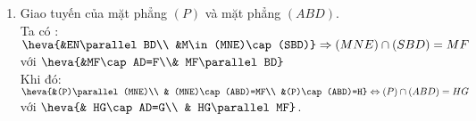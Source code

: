 \begin{bt}
{\begin{enumerate}
			\item Giao tuyến của mặt phẳng $(P)$ và mặt phẳng $(ABD)$.\\
			Ta có : \\
			$\heva{&EN\parallel BD\\ &M\in (MNE)\cap (SBD)}\Rightarrow (MNE)\cap (SBD)=MF$ với $\heva{&MF\cap AD=F\\& MF\parallel BD}$\\
			Khi đó:\\
			$\heva{&(P)\parallel (MNE)\\ & (MNE)\cap (ABD)=MF\\ &(P)\cap (ABD)=H} \Leftrightarrow (P)\cap (ABD)=HG$ với $\heva{& HG\cap AD=G\\ & HG\parallel MF}$.
		\end{enumerate}
	}
\end{bt}
